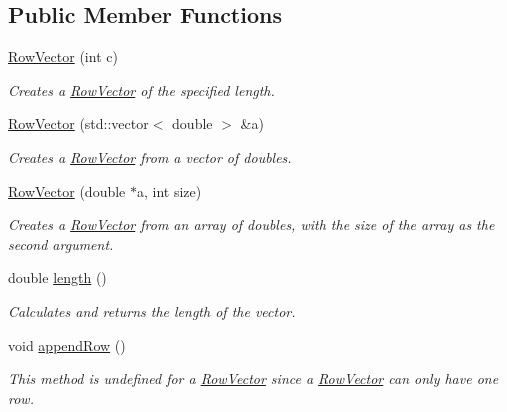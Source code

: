 \subsection*{Public Member Functions}
\begin{DoxyCompactItemize}
\item 
\hyperlink{class_row_vector_a2f27ef01198c0c996290f5d6d1680297}{RowVector} (int c)
\begin{DoxyCompactList}\small\item\em Creates a \hyperlink{class_row_vector}{RowVector} of the specified length. \item\end{DoxyCompactList}\item 
\hyperlink{class_row_vector_a6f0b27522b67138a7313c4a75750a7a6}{RowVector} (std::vector$<$ double $>$ \&a)
\begin{DoxyCompactList}\small\item\em Creates a \hyperlink{class_row_vector}{RowVector} from a vector of doubles. \item\end{DoxyCompactList}\item 
\hyperlink{class_row_vector_afdb9cc1d09c9dfaef6af93aec542f498}{RowVector} (double $\ast$a, int size)
\begin{DoxyCompactList}\small\item\em Creates a \hyperlink{class_row_vector}{RowVector} from an array of doubles, with the size of the array as the second argument. \item\end{DoxyCompactList}\item 
double \hyperlink{class_row_vector_a5c2dde299464fd200026db5515480275}{length} ()
\begin{DoxyCompactList}\small\item\em Calculates and returns the length of the vector. \item\end{DoxyCompactList}\item 
void \hyperlink{class_row_vector_aa04552c6bdfed758bc06815d8696b44c}{appendRow} ()
\begin{DoxyCompactList}\small\item\em This method is undefined for a \hyperlink{class_row_vector}{RowVector} since a \hyperlink{class_row_vector}{RowVector} can only have one row. \item\end{DoxyCompactList}\end{DoxyCompactItemize}


